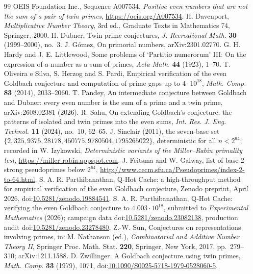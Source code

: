 \documentclass[11pt]{article}
\theoremstyle{definition}
\theoremstyle{remark}
\begin{document}
\begin{thebibliography}{99}
 OEIS Foundation Inc., Sequence A007534, \emph{Positive even
numbers that are not the sum of a pair of twin primes},
\url{https://oeis.org/A007534}.
 H. Davenport, \emph{Multiplicative Number Theory}, 3rd ed.,
Graduate Texts in Mathematics 74, Springer, 2000.
 H. Dubner, Twin prime conjectures, \emph{J. Recreational Math.}
\textbf{30} (1999--2000), no.~3.
 J. Gómez, On primorial numbers, arXiv:2301.02770.
 G. H. Hardy and J. E. Littlewood, Some problems of `Partitio
numerorum' III: On the expression of a number as a sum of primes, \emph{Acta
Math.} \textbf{44} (1923), 1--70.
 T. Oliveira e Silva, S. Herzog and S. Pardi, Empirical
verification of the even Goldbach conjecture and computation of prime gaps up to
$4\cdot10^{18}$, \emph{Math. Comp.} \textbf{83} (2014), 2033--2060.
 T. Pandey, An intermediate conjecture between Goldbach and
Dubner: every even number is the sum of a prime and a twin prime,
arXiv:2608.02381 (2026).
 R. Sahu, On extending Goldbach's conjecture: the patterns of
isolated and twin primes into the even sums, \emph{Int. Res. J. Eng. Technol.}
\textbf{11} (2024), no.~10, 62--65.
 J. Sinclair (2011), the seven-base set
$\{2, 325, 9375, 28178, 450775, 9780504, 1795265022\}$, deterministic for all
$n<2^{64}$; recorded in W. Izykowski, \emph{Deterministic variants of the
Miller--Rabin primality test}, \url{https://miller-rabin.appspot.com}.
 J. Feitsma and W. Galway, list of base-2 strong pseudoprimes below
$2^{64}$, \url{http://www.cecm.sfu.ca/Pseudoprimes/index-2-to-64.html}.
 S. A. R. Parthibanathan, Q-Hot Cache: a high-throughput method for
empirical verification of the even Goldbach conjecture, Zenodo preprint, April 2026,
doi:\href{https://doi.org/10.5281/zenodo.19884541}{10.5281/zenodo.19884541}.
 S. A. R. Parthibanathan, Q-Hot Cache: verifying the even Goldbach
conjecture to $4.003\cdot10^{18}$, submitted to \emph{Experimental Mathematics} (2026); campaign data
doi:\href{https://doi.org/10.5281/zenodo.23082138}{10.5281/zenodo.23082138}, production audit
doi:\href{https://doi.org/10.5281/zenodo.23278480}{10.5281/zenodo.23278480}. %
 Z.-W. Sun, Conjectures on representations involving primes, in:
M. Nathanson (ed.), \emph{Combinatorial and Additive Number Theory II},
Springer Proc. Math. Stat. \textbf{220}, Springer, New York, 2017, pp.~279--310;
arXiv:1211.1588.
 D. Zwillinger, A Goldbach conjecture using twin primes,
\emph{Math. Comp.} \textbf{33} (1979), 1071,
doi:\href{https://doi.org/10.1090/S0025-5718-1979-0528060-5}{10.1090/S0025-5718-1979-0528060-5}.
\end{thebibliography}
\end{document}
